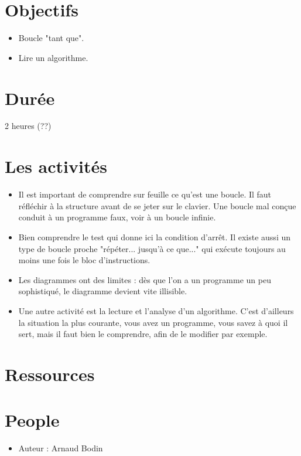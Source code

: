 \documentclass[class=report,crop=false, 12pt]{standalone}
\begin{document}



\section*{Objectifs}

\begin{itemize}
  \item Boucle "tant que".
  
  \item Lire un algorithme.
\end{itemize}


\section*{Durée}

2 heures (??)

\section*{Les activités}

\begin{itemize}
  \item Il est important de comprendre sur feuille ce qu'est une boucle. Il faut réfléchir à la structure avant de se jeter sur le clavier. Une boucle mal conçue conduit à un programme faux, voir à un boucle infinie.
  
  \item Bien comprendre le test qui donne ici la condition d'arrêt. Il existe aussi un type de boucle proche "répéter... jusqu'à ce que..."  qui exécute toujours au moins une fois le bloc d'instructions.
  
  \item Les diagrammes ont des limites : dès que l'on a un programme un peu sophistiqué, le diagramme devient vite illisible.
  
  \item Une autre activité est la lecture et l'analyse d'un algorithme. C'est d'ailleurs la situation la plus courante, vous avez un programme, vous savez à quoi il sert, mais il faut bien le comprendre, afin de le modifier par exemple.
\end{itemize}


\section*{Ressources}


\section*{People}

\begin{itemize}
  \item Auteur : Arnaud Bodin
\end{itemize}
\end{document}
